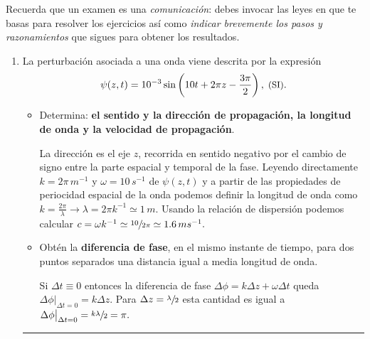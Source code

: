 \documentclass[a4paper,12pt]{exam}
\newcommand{\halmos}{\vspace*{-7mm}
	
					\begin{flushright}
						\rule{1mm}{2.5mm} 
					\end{flushright}\vspace*{-6mm}
						
					  }
\renewcommand{\qed}{\halmos}
\begin{document}
	
\vspace*{-5ex}

\vspace{2ex}

	
\begin{problemas}{Recuerda que un examen es una \textit{comunicación}: debes invocar las leyes en que te basas para resolver los ejercicios así como \textit{indicar brevemente los pasos y razonamientos} que sigues para obtener los resultados.}
\end{problemas}
\vspace{0ex}


\begin{enumerate}
	
		\item La perturbación asociada a una onda viene descrita por la expresión
$$\psi(z,t)= 10^{-3}\sin\left(10t +2\pi z-\frac{3\pi}{2}\right),\; \text{\small (SI)}.$$
	\begin{itemize}
		\item[a)] Determina: \textbf{el sentido y la dirección de propagación, la longitud de onda y la velocidad de propagación}.
		\begin{mdframed}[backgroundcolor=yellow!20]  
		La dirección es el eje $z$, recorrida en sentido negativo por el cambio de signo entre la parte espacial y temporal de la fase. Leyendo directamente $k=2\pi\,m^{-1}$ y $\omega=10\,s^{-1}$ de $\psi(z,t)$ y  a partir de las propiedades de periocidad espacial de la onda podemos definir la longitud de onda como	\(k=\frac{2\pi}{\lambda}\rightarrow \lambda=2\pi k^{-1}\simeq 1\,m.\) Usando la relación de dispersión podemos calcular $c=\omega k^{-1}\simeq \sfrac{10}{2\pi}\simeq 1.6\,ms^{-1}.$
		\end{mdframed}
		\item[b)] Obtén la \textbf{diferencia de fase}, en el mismo instante de tiempo, para dos puntos separados una distancia igual a media longitud de onda.
		\begin{mdframed}[backgroundcolor=yellow!20]  
		Si $\Delta t\equiv 0$ entonces la diferencia de fase $\Delta\phi=k\Delta z+\omega \Delta t$ queda $\Delta\phi\big|_{\Delta t=0}=k\Delta z$. Para $\Delta z=\sfrac{\lambda}{2}$ esta cantidad es igual a $\Delta\phi\big|_{\Delta t=0}=\sfrac{k\lambda}{2}=\pi.$
		\end{mdframed}
	\end{itemize}
	\qed
	\vspace{2ex}


\end{enumerate}
\end{document}
